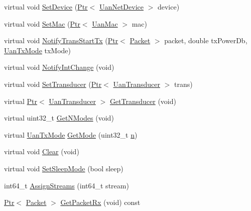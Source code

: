 \begin{DoxyCompactItemize}
\item 
virtual void \hyperlink{classns3_1_1UanPhyDual_a7f004268fa5bc843eb0f6da0f0afebe7}{Set\+Device} (\hyperlink{classns3_1_1Ptr}{Ptr}$<$ \hyperlink{classns3_1_1UanNetDevice}{Uan\+Net\+Device} $>$ device)
\item 
virtual void \hyperlink{classns3_1_1UanPhyDual_aacb72fbc7ccf0fd9206421377ce7a29b}{Set\+Mac} (\hyperlink{classns3_1_1Ptr}{Ptr}$<$ \hyperlink{classns3_1_1UanMac}{Uan\+Mac} $>$ mac)
\item 
virtual void \hyperlink{classns3_1_1UanPhyDual_a5254e55ba511444ed136cb7d6343c37f}{Notify\+Trans\+Start\+Tx} (\hyperlink{classns3_1_1Ptr}{Ptr}$<$ \hyperlink{classns3_1_1Packet}{Packet} $>$ packet, double tx\+Power\+Db, \hyperlink{classns3_1_1UanTxMode}{Uan\+Tx\+Mode} tx\+Mode)
\item 
virtual void \hyperlink{classns3_1_1UanPhyDual_af2cfb10e2fd0109293e0598e27d05971}{Notify\+Int\+Change} (void)
\item 
virtual void \hyperlink{classns3_1_1UanPhyDual_a59d87eb7d5cc715aaa4b135960bdc26b}{Set\+Transducer} (\hyperlink{classns3_1_1Ptr}{Ptr}$<$ \hyperlink{classns3_1_1UanTransducer}{Uan\+Transducer} $>$ trans)
\item 
virtual \hyperlink{classns3_1_1Ptr}{Ptr}$<$ \hyperlink{classns3_1_1UanTransducer}{Uan\+Transducer} $>$ \hyperlink{classns3_1_1UanPhyDual_a13098d0cffdf07587fee50fe06eb6e39}{Get\+Transducer} (void)
\item 
virtual uint32\+\_\+t \hyperlink{classns3_1_1UanPhyDual_a21728bcc8d80fed73e9ae4d2fdd49964}{Get\+N\+Modes} (void)
\item 
virtual \hyperlink{classns3_1_1UanTxMode}{Uan\+Tx\+Mode} \hyperlink{classns3_1_1UanPhyDual_a815b4b3bb5e98f7a895f364c1f2c8561}{Get\+Mode} (uint32\+\_\+t \hyperlink{lte__link__budget__x2__handover__measures_8m_abdb05bc5a064cf642a06c83b3392f148}{n})
\item 
virtual void \hyperlink{classns3_1_1UanPhyDual_a444f12ad8d0707f2242b68e13854ca70}{Clear} (void)
\item 
virtual void \hyperlink{classns3_1_1UanPhyDual_aef6554f09748e765f01ab3b9d86acb7a}{Set\+Sleep\+Mode} (bool sleep)
\item 
int64\+\_\+t \hyperlink{classns3_1_1UanPhyDual_ad58eb44d2836745b230aa669854e4186}{Assign\+Streams} (int64\+\_\+t stream)
\item 
\hyperlink{classns3_1_1Ptr}{Ptr}$<$ \hyperlink{classns3_1_1Packet}{Packet} $>$ \hyperlink{classns3_1_1UanPhyDual_ae371557485d981fbcbdcb1cba5865ac7}{Get\+Packet\+Rx} (void) const 
\item 

\end{DoxyCompactItemize}
